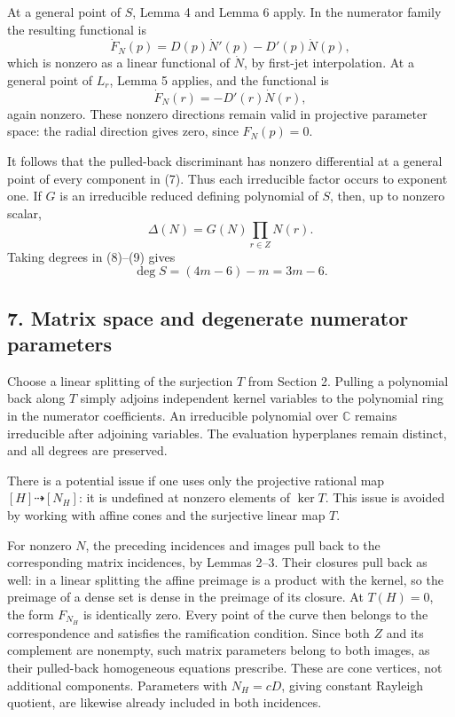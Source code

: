 \documentclass[
  11pt,
]{article}
\begin{document}
At a general point of \(S\), Lemma 4 and Lemma 6 apply. In the numerator
family the resulting functional is \[
 \dot F_N(p)=D(p)\dot N'(p)-D'(p)\dot N(p),
\] which is nonzero as a linear functional of \(\dot N\), by first-jet
interpolation. At a general point of \(L_r\), Lemma 5 applies, and the
functional is \[
 \dot F_N(r)=-D'(r)\dot N(r),
\] again nonzero. These nonzero directions remain valid in projective
parameter space: the radial direction gives zero, since \(F_N(p)=0\).

It follows that the pulled-back discriminant has nonzero differential at
a general point of every component in (7). Thus each irreducible factor
occurs to exponent one. If \(G\) is an irreducible reduced defining
polynomial of \(S\), then, up to nonzero scalar, \[
 \Delta(N)=G(N)\prod_{r\in Z}N(r).
 \tag{9}
\] Taking degrees in (8)--(9) gives \[
 \deg S=(4m-6)-m=3m-6.
 \tag{10}
\]

\subsection{7. Matrix space and degenerate numerator
parameters}\label{matrix-space-and-degenerate-numerator-parameters}

Choose a linear splitting of the surjection \(T\) from Section 2.
Pulling a polynomial back along \(T\) simply adjoins independent kernel
variables to the polynomial ring in the numerator coefficients. An
irreducible polynomial over \(\mathbb C\) remains irreducible after
adjoining variables. The evaluation hyperplanes remain distinct, and all
degrees are preserved.

There is a potential issue if one uses only the projective rational map
\([H]\dashrightarrow[N_H]\): it is undefined at nonzero elements of
\(\ker T\). This issue is avoided by working with affine cones and the
surjective linear map \(T\).

For nonzero \(N\), the preceding incidences and images pull back to the
corresponding matrix incidences, by Lemmas 2--3. Their closures pull
back as well: in a linear splitting the affine preimage is a product
with the kernel, so the preimage of a dense set is dense in the preimage
of its closure. At \(T(H)=0\), the form \(F_{N_H}\) is identically zero.
Every point of the curve then belongs to the correspondence and
satisfies the ramification condition. Since both \(Z\) and its
complement are nonempty, such matrix parameters belong to both images,
as their pulled-back homogeneous equations prescribe. These are cone
vertices, not additional components. Parameters with \(N_H=cD\), giving
constant Rayleigh quotient, are likewise already included in both
incidences.
\end{document}
